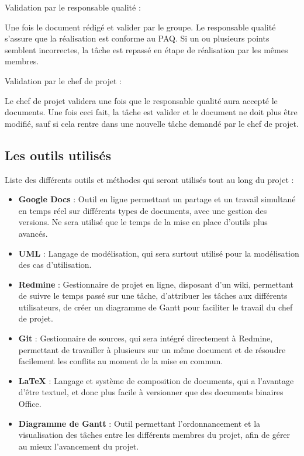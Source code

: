 Validation par le responsable qualité :

Une fois le document rédigé et valider par le groupe. Le responsable qualité s'assure que la réalisation est conforme au PAQ. Si un ou plusieurs points semblent incorrectes, la tâche est repassé en étape de réalisation par les mêmes membres.

Validation par le chef de projet :

Le chef de projet validera une fois que le responsable qualité aura accepté le documents. Une fois ceci fait, la tâche est valider et le document ne doit plus être modifié, sauf si cela rentre dans une nouvelle tâche demandé par le chef de projet.

    \subsection{Les outils utilisés}

Liste des différents outils et méthodes qui seront utilisés tout au long du projet :

\begin{itemize}
\item \textbf{Google Docs} : Outil en ligne permettant un partage et un travail simultané en temps réel sur différents types de documents, avec une gestion des versions. Ne sera utilisé que le temps de la mise en place d'outils plus avancés.
\item \textbf{UML} : Langage de modélisation, qui sera surtout utilisé pour la modélisation des cas d'utilisation.
\item \textbf{Redmine} : Gestionnaire de projet en ligne, disposant d'un wiki, permettant de suivre le temps passé sur une tâche, d'attribuer les tâches aux différents utilisateurs, de créer un  diagramme de Gantt pour faciliter le travail du chef de projet.
\item \textbf{Git} : Gestionnaire de sources, qui sera intégré directement à Redmine, permettant de travailler à plusieurs sur un même document et de résoudre facilement les conflits au moment de la mise en commun.
\item \textbf{LaTeX} : Langage et système de composition de documents, qui a l'avantage d'être textuel, et donc plus facile à versionner que des documents binaires Office.
\item \textbf{Diagramme de Gantt } : Outil permettant l'ordonnancement et la visualisation des tâches entre les différents membres du projet, afin de gérer au mieux l'avancement du projet.
\end{itemize}

